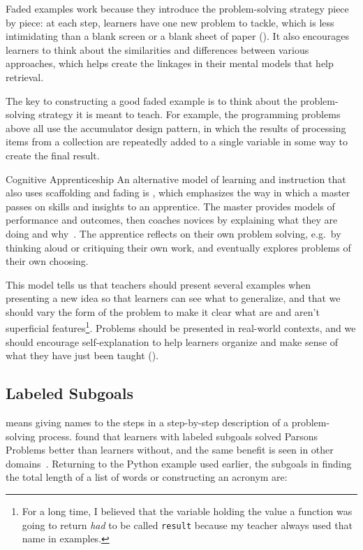 Faded examples work because
they introduce the problem-solving strategy piece by piece:
at each step,
learners have one new problem to tackle,
which is less intimidating than a blank screen or a blank sheet of paper ().
It also encourages learners to think about the similarities and differences between various approaches,
which helps create the linkages in their mental models that help retrieval.

The key to constructing a good faded example is
to think about the problem-solving strategy it is meant to teach.
For example,
the programming problems above all use the accumulator design pattern,
in which the results of processing items from a collection
are repeatedly added to a single variable in some way to create the final result.

\begin{aside}{Cognitive Apprenticeship}
  An alternative model of learning and instruction that also uses scaffolding and fading
  is ,
  which emphasizes the way in which a master passes on skills and insights to an apprentice.
  The master provides models of performance and outcomes,
  then coaches novices by explaining what they are doing and why~\cite{Coll1991,Casp2007}.
  The apprentice reflects on their own problem solving,
  e.g.\ by thinking aloud or critiquing their own work,
  and eventually explores problems of their own choosing.

  This model tells us that
  teachers should present several examples when presenting a new idea
  so that learners can see what to generalize,
  and that we should vary the form of the problem to make it clear
  what are and aren't superficial features\footnote{For a long time,
    I believed that the variable holding the value a function was going to return
    \emph{had} to be called \texttt{result}
    because my teacher always used that name in examples.}.
  Problems should be presented in real-world contexts,
  and we should encourage self-explanation to help learners organize and make sense of what they have just been taught
  ().
\end{aside}

\subsection*{Labeled Subgoals}

 means
giving names to the steps in a step-by-step description of a problem-solving process.
\cite{Marg2016,Morr2016} found that learners with labeled subgoals
solved Parsons Problems better than learners without,
and the same benefit is seen in other domains~\cite{Marg2012}.
Returning to the Python example used earlier,
the subgoals in finding the total length of a list of words or constructing an acronym are:

